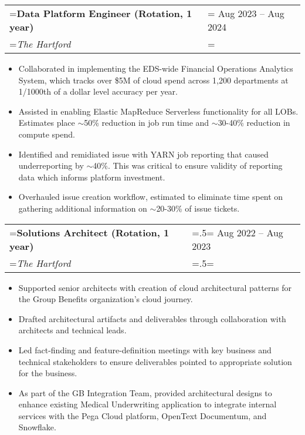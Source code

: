 \documentclass{article}
\begin{document}
\begin{tabularx}{\textwidth}{
    >{\raggedright\arraybackslash\hsize=1\hsize\linewidth=\hsize}X
    >{\raggedleft\arraybackslash\hsize=1\hsize\linewidth=\hsize}X }
    \textbf{Data Platform Engineer (Rotation, 1 year)} & Aug 2023 -- Aug 2024\\
    \textit{The Hartford} & \\
\end{tabularx}
\vspace{-.5em}
\begin{itemize}[label={--}, leftmargin=1em]
    \setlength\itemsep{0em}
    \item Collaborated in implementing the EDS-wide Financial Operations Analytics System, which tracks over \$5M of cloud spend across 1,200 departments at 1/1000th of a dollar level accuracy per year.
    \item Assisted in enabling Elastic MapReduce Serverless functionality for all LOBs. Estimates place $\sim$50\% reduction in job run time and $\sim$30-40\% reduction in compute spend.
    \item Identified and remidiated issue with YARN job reporting that caused underreporting by $\sim$40\%. This was critical to ensure validity of reporting data which informs platform investment.
    \item Overhauled issue creation workflow, estimated to eliminate time spent on gathering additional information on $\sim$20-30\% of issue tickets. 
\end{itemize}

\hspace{-1em}
\begin{tabularx}{\textwidth}{
    >{\raggedright\arraybackslash\hsize=1.5\hsize\linewidth=\hsize}X
    >{\raggedleft\arraybackslash\hsize=.5\hsize\linewidth=\hsize}X }
    \textbf{Solutions Architect (Rotation, 1 year)} & Aug 2022 -- Aug 2023\\
    \textit{The Hartford} & \\
\end{tabularx}
\vspace{-.5em}
\begin{itemize}[label={--}, leftmargin=1em]
    \setlength\itemsep{0em}
    \item Supported senior architects with creation of cloud architectural patterns for the Group Benefits organization's cloud journey.
    \item Drafted architectural artifacts and deliverables through collaboration with architects and technical leads.
    \item Led fact-finding and feature-definition meetings with key business and technical stakeholders to ensure deliverables pointed to appropriate solution for the business.
    \item As part of the GB Integration Team, provided architectural designs to enhance existing Medical Underwriting application to integrate internal services with the Pega Cloud platform, OpenText Documentum, and Snowflake.
\end{itemize}
\end{document}
